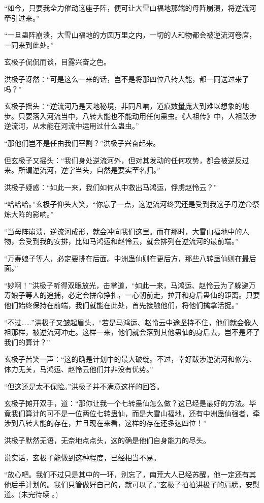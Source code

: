 \begin{this_body}
“如今，只要我全力催动这座子阵，便可让大雪山福地那端的母阵崩溃，将逆流河牵引过来。”

“一旦蛊阵崩溃，大雪山福地的方圆万里之内，一切的人和物都会被逆流河卷席，一同来到此处。”

玄极子侃侃而谈，目露兴奋之色。

洪极子讶然：“可是这么一来的话，岂不是将那四位八转大能，都一同送过来了吗？”

玄极子摇头：“逆流河乃是天地秘境，非同凡响，道痕数量庞大到难以想象的地步。只要落入河流当中，八转大能也不能动用任何蛊虫。《人祖传》中，人祖跋涉逆流河，从未能在河流中运用过什么蛊虫。”

“那他们岂不是任由我们宰割？”洪极子兴奋起来。

但玄极子又摇头：“我们身处逆流河外，但对其发动的任何攻势，都会被逆反过来。所谓逆流河，逆字当头，自然是要实至名归。”

洪极子疑惑：“如此一来，我们如何从中救出马鸿运，俘虏赵怜云？”

“哈哈哈。”玄极子仰头大笑，“你忘了一点，这逆流河终究还是受到我这子母逆命祭炼大阵的影响。”

“当母阵崩溃，逆流河成形，就会冲向我们这里。而在那时，大雪山福地中的人物，会受到我的安排，比如马鸿运和赵怜云，就会排列在逆流河的最前端。”

“万寿娘子等人，必定要排在后面。中洲蛊仙则在更后方，那些八转蛊仙则在最后面。”

“妙啊！”洪极子听得双眼放光，击掌道，“如此一来，马鸿运、赵怜云为了躲避万寿娘子等人的追捕，必定会拼命挣扎，一心朝前走，拉开和身后蛊仙的距离。只要他们始终保持在前端，我们就能在此处，首先接触他们，将他们擒拿活捉。”

“不过……”洪极子又皱起眉头，“若是马鸿运、赵怜云中途坚持不住，他们就会像人祖那样，被逆流河冲走。这样一来，他们就会落到其他蛊仙的身后去，岂不是坏了我们的算计？”

玄极子苦笑一声：“这的确是计划中的最大破绽。不过，幸好跋涉逆流河和修为、体力无关，马鸿运、赵怜云他们并非没有优势。”

“但这还是太不保险。”洪极子并不满意这样的回答。

玄极子摊开双手，道：“那你让我一个七转蛊仙怎么做？这已经是最好的方法。毕竟我们算计的可不是一位两位七转蛊仙，而是大雪山福地，还有中洲蛊仙强者，牵涉到八转大能的存在，并且现在来看，这样的存在还多达四位！”

洪极子默然无语，无奈地点点头，这的确是他们自身能力的尽头。

说实话，玄极子能做到这种程度，已经相当不易。

“放心吧。我们不过只是其中的一环，别忘了，南荒大人已经苏醒，他一定还有其他后手计划的。我们只管做好自己的，就可以了。”玄极子拍拍洪极子的肩膀，安慰道。(未完待续 。)

\end{this_body}

